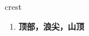 
\begin{frame}
{\huge crest}
\begin{center}
\begin{enumerate}\Large
  \item \textbf{顶部，浪尖，山顶}
\end{enumerate}
\end{center}
\end{frame}
